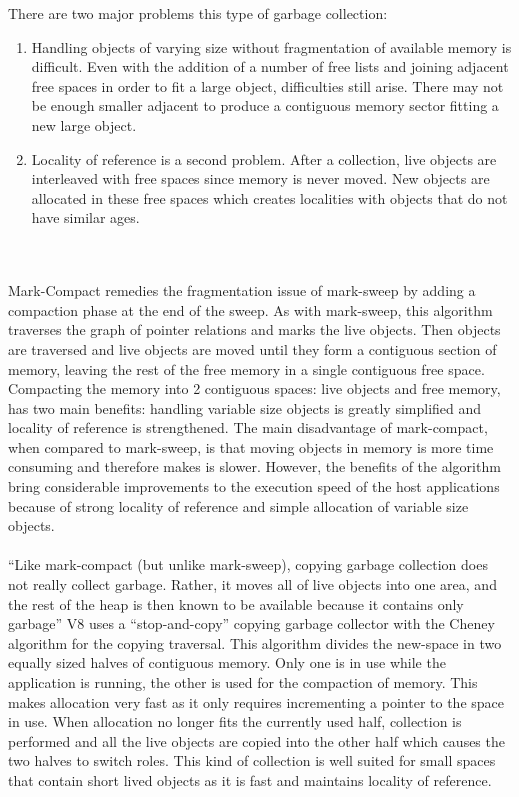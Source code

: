 \documentclass{l4proj}
\begin{document}
There are two major problems this type of garbage collection:
\begin{enumerate}
\item Handling objects of varying size without fragmentation of available memory is difficult. Even with the addition of a number of free lists and joining adjacent free spaces in order to fit a large object, difficulties still arise. There may not be enough smaller adjacent to produce a contiguous memory sector fitting a new large object. 
\item Locality of reference is a second problem. After a collection, live objects are interleaved with free spaces since memory is never moved. New objects are allocated in these free spaces which creates localities with objects that do not have similar ages.
\end{enumerate}
\cite{marksweep}
\\\\
Mark-Compact remedies the fragmentation issue of mark-sweep by adding a compaction phase at the end of the sweep. As with mark-sweep, this algorithm traverses the graph of pointer relations and marks the live objects. Then objects are traversed and live objects are moved until they form a contiguous section of memory, leaving the rest of the free memory in a single contiguous free space. Compacting the memory into 2 contiguous spaces: live objects and free memory, has two main benefits: handling variable size objects is greatly simplified and locality of reference is strengthened. The main disadvantage of mark-compact, when compared to mark-sweep, is that moving objects in memory is more time consuming and therefore makes is slower. However, the benefits of the algorithm bring considerable improvements to the execution speed of the host applications because of strong locality of reference and simple allocation of variable size objects.\cite{markcompact}
\\\\
\hspace*{3em} ``Like mark-compact (but unlike mark-sweep), copying garbage collection does not really collect garbage. Rather, it moves all of live objects into one area, and the rest of the heap is then known to be available because it contains only garbage'' \cite{copygc} V8 uses a ``stop-and-copy'' copying garbage collector with the Cheney algorithm for the copying traversal. This algorithm divides the new-space in two equally sized halves of contiguous memory. Only one is in use while the application is running, the other is used for the compaction of memory. This makes allocation very fast as it only requires incrementing a pointer to the space in use. When allocation no longer fits the currently used half, collection is performed and all the live objects are copied into the other half which causes the two halves to switch roles.\cite{copygc} This kind of collection is well suited for small spaces that contain short lived objects as it is fast and maintains locality of reference.
\end{document}
